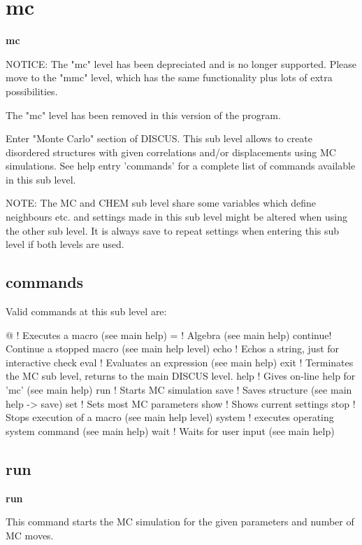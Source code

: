 \section{mc}
{\bf mc \par }
\par
\vspace{3pt}
NOTICE: 
The "mc" level has been depreciated and is no longer supported. 
Please move to the "mmc" level, which has the same functionality 
plus lots of extra possibilities. 
\par
The "mc" level has been removed in this version of the program. 
\par
\par
Enter "Monte Carlo" section of DISCUS. This sub level allows to create 
disordered structures with given correlations and/or displacements 
using MC simulations. See help entry 'commands' for a complete list 
of commands available in this sub level. 
\par
NOTE: The MC and CHEM sub level share some variables which define 
      neighbours etc. and settings made in this sub level might be 
      altered when using the other sub level. It is always save to 
      repeat settings when entering this sub level if both levels 
      are used. 
\par
\subsection*{commands}
Valid commands at this sub level are: 
\par
\begin{MacVerbatim}
@       ! Executes a macro (see main help)
=       ! Algebra (see main help)
continue! Continue a stopped macro (see main help level)
echo    ! Echos a string, just for interactive check
eval    ! Evaluates an expression (see main help)
exit    ! Terminates the MC sub level, returns to the main DISCUS level.
help    ! Gives on-line help for 'mc' (see main help)
run     ! Starts MC simulation
save    ! Saves structure (see main help -> save)
set     ! Sets most MC parameters
show    ! Shows current settings
stop    ! Stops execution of a macro (see main help level)
system  ! executes operating system command (see main help)
wait    ! Waits for user input (see main help)
\end{MacVerbatim}
\subsection*{run}
{\bf run \par }
\par
\vspace{3pt}
This command starts the MC simulation for the given parameters and 
number of MC moves. 
